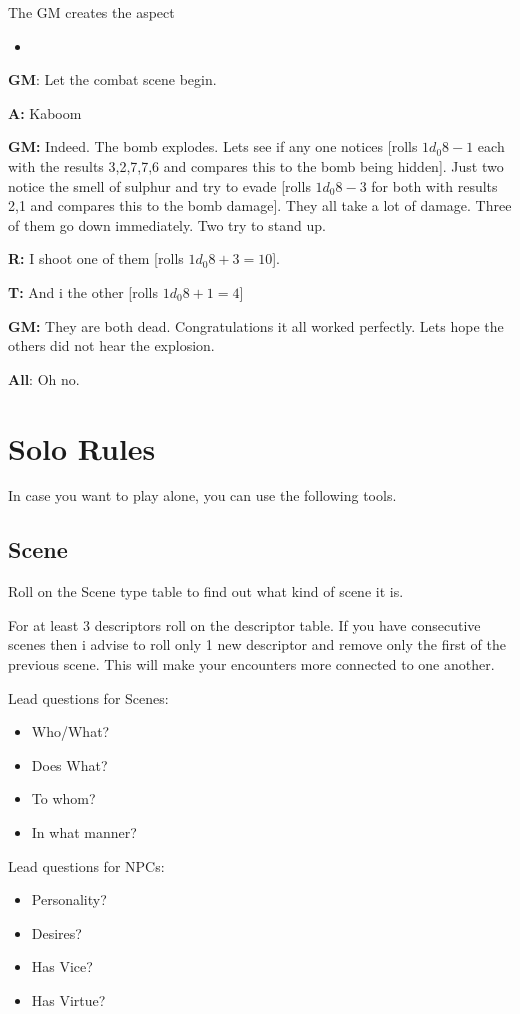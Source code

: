 \documentclass[11pt]{article}
\begin{document}
{The GM creates the aspect
\begin{itemize}
\item {}
\end{itemize}

\textbf{GM}: Let the combat scene begin.

\textbf{A:} Kaboom

\textbf{GM:} Indeed. The bomb explodes. Lets see if any one notices [rolls \(1 d_0 8 - 1\) each with the results 3,2,7,7,6 and compares this to the bomb being hidden]. Just two notice the smell of sulphur and try to evade [rolls \(1 d_0 8 - 3\) for both with results 2,1 and compares this to the bomb damage]. They all take a lot of damage. Three of them go down immediately. Two try to stand up.

\textbf{R:} I shoot one of them [rolls \(1 d_0 8 + 3 = 10\)].

\textbf{T:} And i the other [rolls \(1 d_0 8 + 1 = 4\)]

\textbf{GM:} They are both dead. Congratulations it all worked perfectly. Lets hope the others did not hear the explosion.

\textbf{All}: Oh no.


\newpage
\section{Solo Rules}
\label{sec:org7f00c21}
In case you want to play alone, you can use the following tools.
\subsection{Scene}
\label{sec:orgced143f}
Roll on the Scene type table to find out what kind of scene it is.

For at least 3 descriptors roll on the descriptor table. If you have consecutive scenes then i advise to roll only 1 new descriptor and remove only the first of the previous scene. This will make your encounters more connected to one another.

\begin{multicols}{2}
Lead questions for Scenes: 
\begin{itemize}
\item Who/What?
\item Does What?
\item To whom?
\item In what manner?
\end{itemize}
\columnbreak
Lead questions for NPCs:
\begin{itemize}
\item Personality?
\item Desires?
\item Has Vice?
\item Has Virtue?
\end{itemize}
\end{multicols}

}
\end{document}
